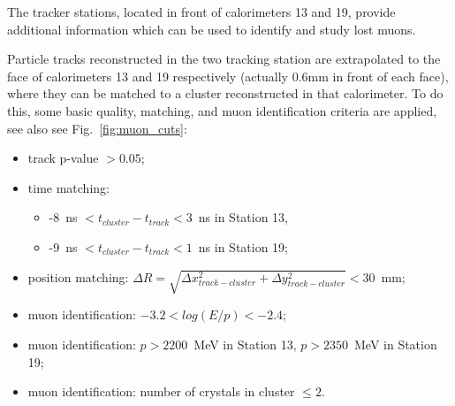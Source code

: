 \documentclass[a4paper, 11pt]{article}
\begin{document}

The tracker stations, located in front of calorimeters 13 and 19, provide additional information which can be used to identify and study lost muons.

Particle tracks reconstructed in the two tracking station are extrapolated to the face of calorimeters 13 and 19 respectively (actually 0.6mm in front of each face), where they can be matched to a cluster reconstructed in that calorimeter. To do this, some basic quality, matching, and muon identification criteria are applied, see also see Fig.~\ref{fig:muon_cuts}:

\begin{itemize}
\item track p-value $> 0.05$; 
\item time matching:
  \begin{itemize}
  \item-8~ns $< t_{cluster} - t_{track} < 3 $~ns in Station 13,
    \item-9~ns $< t_{cluster} - t_{track} < 1 $~ns in Station 19;
\end{itemize}
      
\item position matching: $\Delta R = \sqrt{\Delta x_{track-cluster}^2 + \Delta y_{track-cluster}^2} < 30$~mm;
\item muon identification: $-3.2 < log(E/p) < -2.4$;
\item muon identification: $p > 2200$~MeV in Station 13, $p>2350$~MeV in Station 19;
\item muon identification: number of crystals in cluster $\le2$.
\end{itemize}
\end{document}
